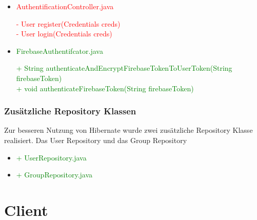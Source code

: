 \documentclass[a4paper]{scrreprt}
\begin{document}
\begin{itemize}
\item\textcolor{red}{AuthentificationController.java}

\textcolor{red}{- User register(Credentials creds)}\\
\textcolor{red}{- User login(Credentials creds)}\\

\item\textcolor{green}{FirebaseAuthentifcator.java}

\textcolor{green}{+ String authenticateAndEncryptFirebaseTokenToUserToken(String firebaseToken)}\\
\textcolor{green}{+ void authenticateFirebaseToken(String firebaseToken)}
\end{itemize}

\subsubsection{Zusätzliche Repository Klassen}
Zur besseren Nutzung von Hibernate wurde zwei zusätzliche Repository Klasse realisiert. Das User Repository und das Group Repository

\begin{itemize}
\item\textcolor{green}{+ UserRepository.java}
\item\textcolor{green}{+ GroupRepository.java}
\end{itemize}


\section{Client}
\end{document}
